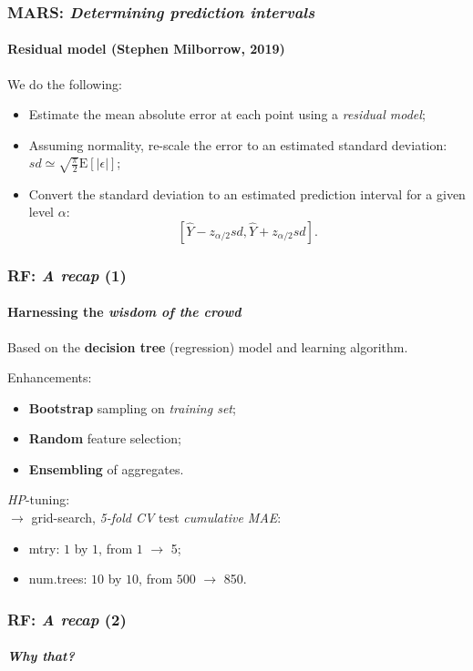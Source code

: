 \documentclass{beamer}
\begin{document}
{\begin{frame}
	\frametitle{MARS: \textit{Determining prediction intervals}}
	\framesubtitle{Residual model (Stephen Milborrow, 2019)}

	We do the following:

	\begin{itemize}
		\item Estimate the mean absolute error at each point using a \textit{residual model};
		\item Assuming normality, re-scale the error to an estimated standard deviation: $sd \simeq \sqrt{\frac{\pi}{2}} \text{E}[{|\epsilon|}]$;
		\item Convert the standard deviation to an estimated prediction interval for a given level $\alpha$:
		$$ [\hat{Y}-z_{\alpha/2}sd, \hat{Y}+z_{\alpha/2}sd]. $$
	\end{itemize}

\end{frame}

\begin{frame}
	\frametitle{RF: \textit{A recap} (1)}
	\framesubtitle{Harnessing the \textit{wisdom of the crowd}}

	Based on the \textbf{decision tree} (regression) model and learning algorithm.

	\hfill

	Enhancements:
	\begin{itemize}
		\item{\textbf{Bootstrap} sampling on \textit{training set};}
		\item{\textbf{Random} feature selection;}
		\item{\textbf{Ensembling} of aggregates}.
	\end{itemize}

	\hfill

	\textit{HP}-tuning:\\
	$\rightarrow$ grid-search, \textit{5-fold CV} test \textit{cumulative MAE}:
	\begin{itemize}
		\item{\textsf{mtry}: $1$ by $1$, from $1$ $\rightarrow$ 5;}
		\item{\textsf{num.trees}: $10$ by $10$, from $500$ $\rightarrow$ 850.}
	\end{itemize}


\end{frame}


\begin{frame}
	\frametitle{RF: \textit{A recap} (2)}
	\framesubtitle{\textit{Why that?}}


\end{frame}}
\end{document}
